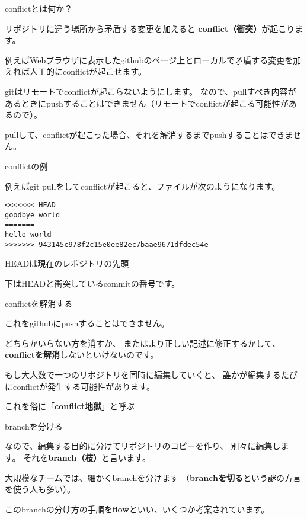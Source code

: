 \documentclass[12pt, unicode]{beamer}
\begin{document}
\begin{frame}{conflictとは何か？}

リポジトリに違う場所から矛盾する変更を加えると
\textbf{conflict（衝突）}が起こります。

例えばWebブラウザに表示したgithubのページ上とローカルで矛盾する変更を加えれば人工的にconflictが起こせます。

gitはリモートでconflictが起こらないようにします。
なので、pullすべき内容があるときにpushすることはできません（リモートでconflictが起こる可能性があるので）。

pullして、conflictが起こった場合、それを解消するまでpushすることはできません。

\end{frame}
\begin{frame}[fragile]{conflictの例}

例えばgit pullをしてconflictが起こると、ファイルが次のようになります。

\begin{verbatim}
<<<<<<< HEAD
goodbye world
=======
hello world
>>>>>>> 943145c978f2c15e0ee82ec7baae9671dfdec54e
\end{verbatim}

HEADは現在のレポジトリの先頭

下はHEADと衝突しているcommitの番号です。

\end{frame}
\begin{frame}{conflictを解消する}

これをgithubにpushすることはできません。

どちらかいらない方を消すか、
またはより正しい記述に修正するかして、
\textbf{conflictを解消}しないといけないのです。

もし大人数で一つのリポジトリを同時に編集していくと、
誰かが編集するたびにconflictが発生する可能性があります。

これを俗に「\textbf{conflict地獄}」と呼ぶ

\end{frame}
\begin{frame}{branchを分ける}

なので、編集する目的に分けてリポジトリのコピーを作り、
別々に編集します。
それを\textbf{branch（枝）}と言います。

大規模なチームでは、細かくbranchを分けます
（\textbf{branchを切る}という謎の方言を使う人も多い）。

このbranchの分け方の手順を\textbf{flow}といい、いくつか考案されています。

\end{frame}
\end{document}
